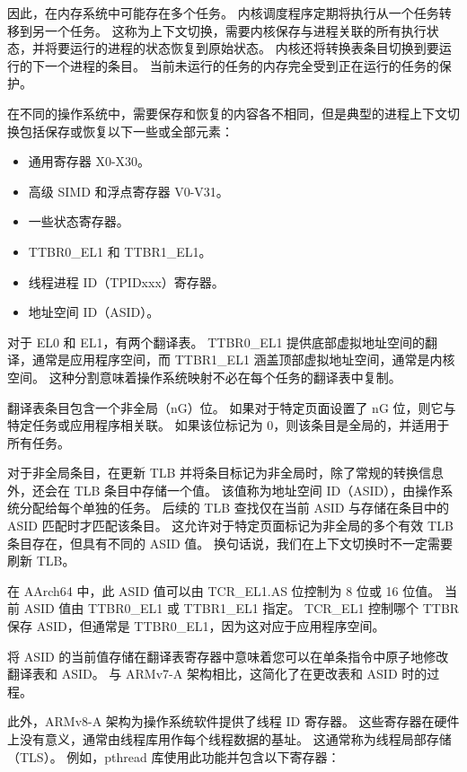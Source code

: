 因此，在内存系统中可能存在多个任务。
内核调度程序定期将执行从一个任务转移到另一个任务。
这称为上下文切换，需要内核保存与进程关联的所有执行状态，并将要运行的进程的状态恢复到原始状态。
内核还将转换表条目切换到要运行的下一个进程的条目。
当前未运行的任务的内存完全受到正在运行的任务的保护。

在不同的操作系统中，需要保存和恢复的内容各不相同，但是典型的进程上下文切换包括保存或恢复以下一些或全部元素：

\begin{itemize}
  \item 通用寄存器 X0-X30。
  \item 高级 SIMD 和浮点寄存器 V0-V31。
  \item 一些状态寄存器。
  \item TTBR0\_EL1 和 TTBR1\_EL1。
  \item 线程进程 ID（TPIDxxx）寄存器。
  \item 地址空间 ID（ASID）。
\end{itemize}

对于 EL0 和 EL1，有两个翻译表。
TTBR0\_EL1 提供底部虚拟地址空间的翻译，通常是应用程序空间，而 TTBR1\_EL1 涵盖顶部虚拟地址空间，通常是内核空间。
这种分割意味着操作系统映射不必在每个任务的翻译表中复制。

翻译表条目包含一个非全局（nG）位。
如果对于特定页面设置了 nG 位，则它与特定任务或应用程序相关联。
如果该位标记为 0，则该条目是全局的，并适用于所有任务。

对于非全局条目，在更新 TLB 并将条目标记为非全局时，除了常规的转换信息外，还会在 TLB 条目中存储一个值。
该值称为地址空间 ID（ASID），由操作系统分配给每个单独的任务。
后续的 TLB 查找仅在当前 ASID 与存储在条目中的 ASID 匹配时才匹配该条目。
这允许对于特定页面标记为非全局的多个有效 TLB 条目存在，但具有不同的 ASID 值。
换句话说，我们在上下文切换时不一定需要刷新 TLB。

在 AArch64 中，此 ASID 值可以由 TCR\_EL1.AS 位控制为 8 位或 16 位值。
当前 ASID 值由 TTBR0\_EL1 或 TTBR1\_EL1 指定。
TCR\_EL1 控制哪个 TTBR 保存 ASID，但通常是 TTBR0\_EL1，因为这对应于应用程序空间。

\begin{Tcbox}[title={Note}]
  将 ASID 的当前值存储在翻译表寄存器中意味着您可以在单条指令中原子地修改翻译表和 ASID。
  与 ARMv7-A 架构相比，这简化了在更改表和 ASID 时的过程。
\end{Tcbox}

此外，ARMv8-A 架构为操作系统软件提供了线程 ID 寄存器。
这些寄存器在硬件上没有意义，通常由线程库用作每个线程数据的基址。
这通常称为线程局部存储（TLS）。
例如，pthread 库使用此功能并包含以下寄存器：

